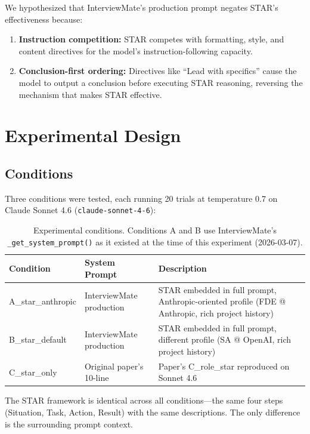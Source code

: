 \documentclass[11pt]{article}
\begin{document}
We hypothesized that InterviewMate's production prompt negates STAR's effectiveness because:
\begin{enumerate}[leftmargin=2em]
\item \textbf{Instruction competition:} STAR competes with formatting, style, and content directives for the model's instruction-following capacity.
\item \textbf{Conclusion-first ordering:} Directives like ``Lead with specifics'' cause the model to output a conclusion before executing STAR reasoning, reversing the mechanism that makes STAR effective.
\end{enumerate}

\section{Experimental Design}

\subsection{Conditions}

Three conditions were tested, each running 20 trials at temperature 0.7 on Claude Sonnet 4.6 (\texttt{claude-sonnet-4-6}):

\begin{table}[H]
\centering
\begin{tabular}{llp{7cm}}
\toprule
\textbf{Condition} & \textbf{System Prompt} & \textbf{Description} \\
\midrule
A\_star\_anthropic & InterviewMate production & STAR embedded in full prompt, Anthropic-oriented profile (FDE @ Anthropic, rich project history) \\
B\_star\_default & InterviewMate production & STAR embedded in full prompt, different profile (SA @ OpenAI, rich project history) \\
C\_star\_only & Original paper's 10-line & Paper's C\_role\_star reproduced on Sonnet 4.6 \\
\bottomrule
\end{tabular}
\caption{Experimental conditions. Conditions A and B use InterviewMate's \texttt{\_get\_system\_prompt()} as it existed at the time of this experiment (2026-03-07).}
\label{tab:conditions}
\end{table}

The STAR framework is identical across all conditions---the same four steps (Situation, Task, Action, Result) with the same descriptions. The only difference is the surrounding prompt context.
\end{document}

